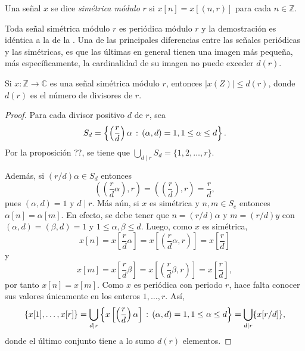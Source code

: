 \begin{definition}
Una señal $x$ se dice \emph{simétrica módulo} $r$ si $x[n] = x[(n,r)]$ para cada $n \in \mathbb{Z}$.
\end{definition}

Toda señal simétrica módulo $r$ es periódica módulo $r$ y la demostración es idéntica a la de la . Una de las principales diferencias entre las señales periódicas y las simétricas, es que las últimas en general tienen una imagen más pequeña, más específicamente, la cardinalidad de su imagen no puede exceder $d(r)$.

\begin{proposition}\label{prop:fou3}
Si $x : \mathbb{Z} \longrightarrow \mathbb{C}$ es una señal simétrica módulo $r$, entonces $| x (Z) | \le d(r)$, donde $d(r)$ es el número de divisores de $r$.
\end{proposition}

\begin{proof}
Para cada divisor positivo $d$ de $r$, sea
\begin{equation*}
    S_d = \left\{ \left( \frac{r}{d} \right) \alpha \, : \, (\alpha,d) = 1, 1 \le \alpha \le d \right\}.
\end{equation*}
Por la proposición ??, se tiene que $\bigcup_{d \mid r} S_d = \{ 1,2,\ldots,r \}$.
\bigskip

Además, si $(r/d)\alpha \in S_d$ entonces
\begin{equation}\label{eq:res1}
    \left( \left( \frac{r}{d} \alpha \right),r \right) = \left( \left( \frac{r}{d} \right),r \right) = \frac{r}{d},
\end{equation}
pues $(\alpha,d)=1$ y $d \mid r$. Más aún, si $x$ es simétrica y $n, m \in S_e$ entonces $\alpha[n]=\alpha[m]$. En efecto, se debe tener que $n = (r/d) \alpha$ y $m = (r/d) y$ con $(\alpha,d)=(\beta,d)=1$ y $1 \le \alpha,\beta \le d$. Luego, como $x$ es simétrica,
\begin{equation*}
    x[n] = x \left[ \frac{r}{d} \alpha \right] = x \left[ \left( \frac{r}{d} \alpha, r \right) \right] = x \left[ \frac{r}{d} \right]
\end{equation*}
y
\begin{equation*}
    x[m] = x \left[ \frac{r}{d} \beta \right] = x \left[ \left( \frac{r}{d} \beta, r \right) \right] = x \left[ \frac{r}{d} \right],
\end{equation*}
por tanto $x[n]=x[m]$. Como $x$ es periódica con periodo $r$, hace falta conocer sus valores únicamente en los enteros $1,\ldots,r$. Así,
\begin{equation*}
    \{ x[1], \ldots, x[r] \} = \bigcup_{d \mid r} \left\{ x \left [\left( \frac{r}{d} \right) \alpha \right] \, : \, (\alpha,d)=1, 1 \le \alpha \le d \right\} = \bigcup_{d \mid r} \{ x[r/d] \},
\end{equation*}
donde el último conjunto tiene a lo sumo $d(r)$ elementos.
\end{proof}

